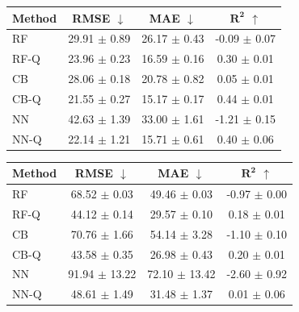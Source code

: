 \begin{table}[t]
    \vspace{1em}

    \begin{minipage}{0.48\textwidth}
        \centering
        \label{tab:ood-ampere}
        \begin{tabular}{lccc}
            \toprule
            \textbf{Method} & \textbf{RMSE} $\downarrow$ & \textbf{MAE} $\downarrow$ & $\boldsymbol{R^2}$ $\uparrow$ \\
            \midrule
            RF      & 29.91 $\pm$ 0.89 & 26.17 $\pm$ 0.43 & -0.09 $\pm$ 0.07 \\
            RF-Q    & 23.96 $\pm$ 0.23 & 16.59 $\pm$ 0.16 & 0.30 $\pm$ 0.01 \\
            \midrule
            CB      & 28.06 $\pm$ 0.18 & 20.78 $\pm$ 0.82 & 0.05 $\pm$ 0.01 \\
            CB-Q    & 21.55 $\pm$ 0.27 & 15.17 $\pm$ 0.17 & 0.44 $\pm$ 0.01 \\
            \midrule
            NN      & 42.63 $\pm$ 1.39 & 33.00 $\pm$ 1.61 & -1.21 $\pm$ 0.15 \\
            NN-Q    & 22.14 $\pm$ 1.21 & 15.71 $\pm$ 0.61 & 0.40 $\pm$ 0.06 \\
            \bottomrule
        \end{tabular}
    \end{minipage}
    \hfill
    \begin{minipage}{0.48\textwidth}
        \centering
        \label{tab:ood-tesla}
        \begin{tabular}{lccc}
            \toprule
            \textbf{Method} & \textbf{RMSE} $\downarrow$ & \textbf{MAE} $\downarrow$ & $\boldsymbol{R^2}$ $\uparrow$ \\
            \midrule
            RF      & 68.52 $\pm$ 0.03 & 49.46 $\pm$ 0.03 & -0.97 $\pm$ 0.00 \\
            RF-Q    & 44.12 $\pm$ 0.14 & 29.57 $\pm$ 0.10 & 0.18 $\pm$ 0.01 \\
            \midrule
            CB      & 70.76 $\pm$ 1.66 & 54.14 $\pm$ 3.28 & -1.10 $\pm$ 0.10 \\
            CB-Q    & 43.58 $\pm$ 0.35 & 26.98 $\pm$ 0.43 & 0.20 $\pm$ 0.01 \\
            \midrule
            NN      & 91.94 $\pm$ 13.22 & 72.10 $\pm$ 13.42 & -2.60 $\pm$ 0.92 \\
            NN-Q    & 48.61 $\pm$ 1.49 & 31.48 $\pm$ 1.37 & 0.01 $\pm$ 0.06 \\
            \bottomrule
        \end{tabular}
    \end{minipage}
\end{table}